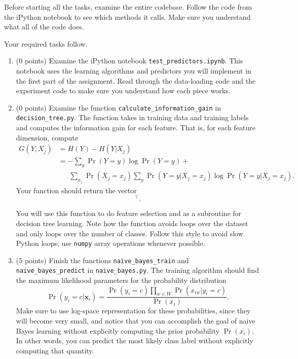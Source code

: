 \documentclass[10pt]{article}
\newcommand{\bx}{{\boldsymbol x}}
\begin{document}
Before starting all the tasks, examine the entire codebase. Follow the code from the iPython notebook to see which methods it calls. Make sure you understand what all of the code does. 

Your required tasks follow.

\begin{enumerate}

\item (0 points) Examine the iPython notebook \texttt{test\_predictors.ipynb}. This notebook uses the learning algorithms and predictors you will implement in the first part of the assignment. Read through the data-loading code and the experiment code to make sure you understand how each piece works.

\item (0 points) Examine the function \texttt{calculate\_information\_gain} in \texttt{decision\_tree.py}. The function takes in training data and training labels and computes the information gain for each feature. That is, for each feature dimension, compute
\begin{equation}
\begin{aligned}
G(Y, X_j) &= H(Y) - H(Y|X_j)\\
&= - \sum_{y} \Pr(Y = y) \log \Pr(Y = y) +\\
&~~~~~~~ \sum_{x_j} \Pr(X_j = x_j) \sum_{y} \Pr(Y = y | X_j = x_j) \log \Pr(Y = y | X_j = x_j).
\end{aligned}
\label{eq:infogain}
\end{equation}
Your function should return the vector
\begin{equation}
[G(Y, X_1), \ldots, G(Y, X_d)]^\top.
\end{equation}

You will use this function to do feature selection and as a subroutine for decision tree learning. Note how the function avoids loops over the dataset and only loops over the number of classes. Follow this style to avoid slow Python loops; use \texttt{numpy} array operations whenever possible. 

\item (5 points) Finish the functions \texttt{naive\_bayes\_train} and \texttt{naive\_bayes\_predict} in \texttt{naive\_bayes.py}. The training algorithm should find the maximum likelihood parameters for the probability distribution
\[
\Pr(y_i = c | \bx_i) = \frac{\Pr(y_i = c) \prod_{w \in W} \Pr(x_{iw} | y_i = c)}{\Pr(x_i)}.
\]
Make sure to use log-space representation for these probabilities, since they will become very small, and notice that you can accomplish the goal of naive Bayes learning without explicitly computing the prior probability $\Pr(x_i)$. In other words, you can predict the most likely class label without explicitly computing that quantity. 


\end{enumerate}
\end{document}
